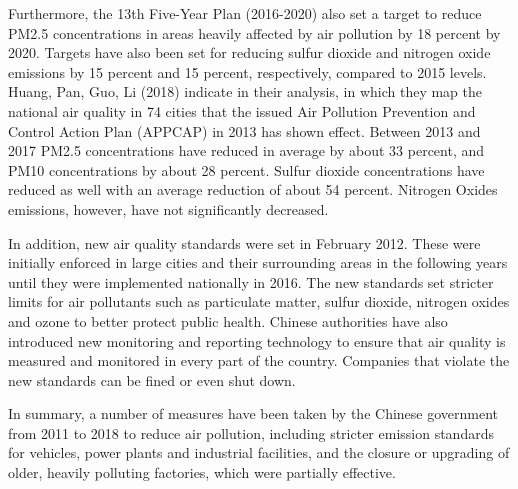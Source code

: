 \documentclass[]{article}
\begin{document}
Furthermore, the 13th Five-Year Plan (2016-2020) also set a target to reduce PM2.5 concentrations in areas heavily affected by air pollution by 18 percent by 2020. Targets have also been set for reducing sulfur dioxide and nitrogen oxide emissions by 15 percent and 15 percent, respectively, compared to 2015 levels. %
Huang, Pan, Guo, Li (2018) indicate in their analysis, in which they map the national air quality in 74 cities that the issued Air Pollution Prevention and Control Action Plan (APPCAP) in 2013 has shown effect. Between 2013 and 2017 PM2.5 concentrations have reduced in average by about 33 percent, and PM10 concentrations by about 28 percent. Sulfur dioxide concentrations have reduced as well with an average reduction of about 54 percent. Nitrogen Oxides emissions, however, have not significantly decreased. %

In addition, new air quality standards were set in February 2012. These were initially enforced in large cities and their surrounding areas in the following years until they were implemented nationally in 2016. The new standards set stricter limits for air pollutants such as particulate matter, sulfur dioxide, nitrogen oxides and ozone to better protect public health. Chinese authorities have also introduced new monitoring and reporting technology to ensure that air quality is measured and monitored in every part of the country. Companies that violate the new standards can be fined or even shut down. %

In summary, a number of measures have been taken by the Chinese government from 2011 to 2018 to reduce air pollution, including stricter emission standards for vehicles, power plants and industrial facilities, and the closure or upgrading of older, heavily polluting factories, which were partially effective. %

\end{document}
